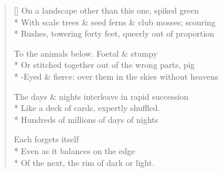 \begin{verse}[\versewidth]
On a landscape other than this one, spiked green\\*
With scale trees \& seed ferns \& club mosses; scouring\\*
Rushes, towering forty feet, queerly out of proportion

To the animals below.  Foetal \& stumpy\\*
Or stitched together out of the wrong parts, pig\\*
-Eyed \& fierce: over them in the skies without heavens

The days \& nights interleave in rapid succession\\*
Like a deck of cards, expertly shuffled.\\*
Hundreds of millions of days   of nights  

Each forgets itself\\*
Even as it balances on the edge\\*
Of the next, the rim of dark or light.
\end{verse}
